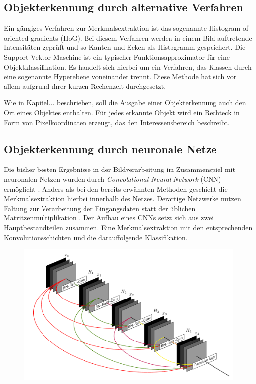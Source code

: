 	
		\subsection{Objekterkennung durch alternative Verfahren}		
		Ein gängiges Verfahren zur Merkmalsextraktion ist das sogenannte Histogram of oriented gradients (HoG). Bei diesem Verfahren werden in einem Bild auftretende Intensitäten geprüft und so Kanten und Ecken als Histogramm gespeichert. Die Support Vektor Maschine ist ein typischer Funktionsapproximator für eine Objektklassifikation. Es handelt sich hierbei um ein Verfahren, das Klassen durch eine sogenannte Hyperebene voneinander trennt. Diese Methode hat sich vor allem aufgrund ihrer kurzen Rechenzeit durchgesetzt.
			
		Wie in Kapitel... beschrieben, soll die Ausgabe einer Objekterkennung auch den Ort eines Objektes enthalten. Für jedes erkannte Objekt wird ein Rechteck in Form von Pixelkoordinaten erzeugt, das den Interessensbereich beschreibt.
	
		\subsection{Objekterkennung durch neuronale Netze}
		
		Die bisher besten Ergebnisse in der Bildverarbeitung im Zusammenspiel mit neuronalen Netzen wurden durch \textit{Convolutional Neural Network} (CNN) ermöglicht \cite{deeplearning}. Anders als bei den bereits erwähnten Methoden geschieht die Merkmalsextraktion hierbei innerhalb des Netzes. Derartige Netzwerke nutzen Faltung zur Verarbeitung der Eingangsdaten statt der üblichen Matritzenmultiplikation \cite{deeplearning}. Der Aufbau eines CNNs setzt sich aus zwei Hauptbestandteilen zusammen. Eine Merkmalsextraktion mit den entsprechenden Konvolutionsschichten und die darauffolgende Klassifikation.\\ 
	
		\begin{figure}[H]
			\centering
			\includegraphics{Bilder/cnn.pdf}
		\end{figure}
	 	
